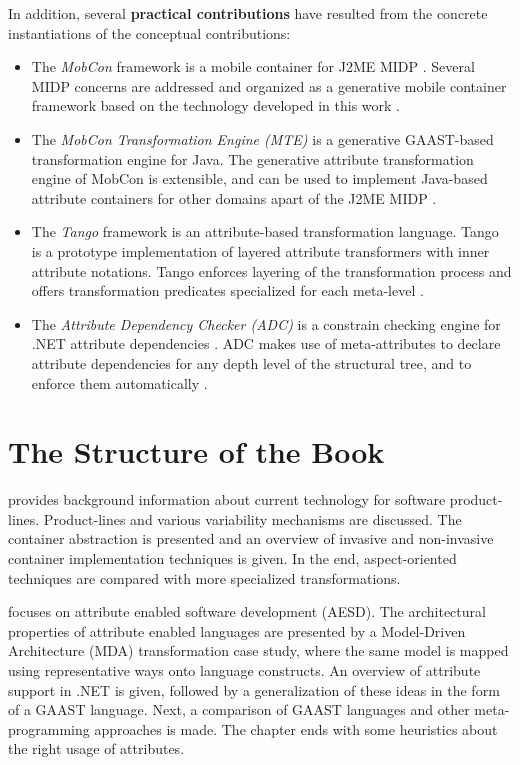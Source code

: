 \noindent In addition, several \textbf{practical contributions} have resulted from the concrete instantiations of the conceptual contributions:

\begin{itemize}
\item The \textit{MobCon} framework \cite{cepa.mezini.hicss38} is a mobile container for J2ME MIDP \cite{www.midp-ota}. Several MIDP concerns are addressed and organized as a generative mobile container framework based on the technology developed in this work .

\item The \textit{MobCon Transformation Engine (MTE)} is a generative GAAST-based transformation engine for Java. The generative attribute transformation engine of MobCon is extensible, and can be used to implement Java-based attribute containers for other domains apart of the J2ME MIDP .

\item The \textit{Tango} framework \cite{cepa.tango.ICSR8} is an attribute-based transformation language. Tango is a prototype implementation of layered attribute transformers with inner attribute notations. Tango enforces layering of the transformation process and offers transformation predicates specialized for each meta-level .

\item The \textit{Attribute Dependency Checker (ADC)} \cite{cepa.mezini.gpce.04} is a constrain checking engine for .NET attribute dependencies \cite{www.dotnet}. ADC makes use of meta-attributes to declare attribute dependencies for any depth level of the structural tree, and to enforce them automatically .

\end{itemize}

\section{The Structure of the Book}

 provides background information about current technology for software product-lines. Product-lines and various variability mechanisms are discussed. The container abstraction is presented and an overview of invasive and non-invasive container implementation techniques is given. In the end, aspect-oriented techniques are compared with more specialized transformations.

 focuses on attribute enabled software development (AESD). The architectural properties of attribute enabled languages are presented by a Model-Driven Architecture (MDA) transformation case study, where the same model is mapped using representative ways onto language constructs. An overview of attribute support in .NET is given, followed by a generalization of these ideas in the form of a GAAST language. Next, a comparison of GAAST languages and other meta-programming approaches is made. The chapter ends with some heuristics about the right usage of attributes.

